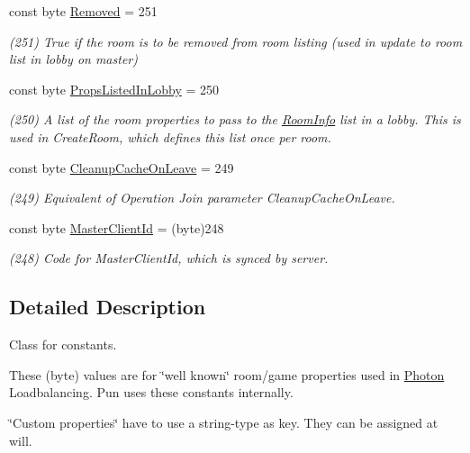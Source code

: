 \begin{DoxyCompactItemize}
const byte \hyperlink{class_exit_games_1_1_client_1_1_photon_1_1_game_property_key_a18ac3b26c2e0f3efbe3bd03afbae74f6}{Removed} = 251
\begin{DoxyCompactList}\small\item\em (251) True if the room is to be removed from room listing (used in update to room list in lobby on master)\end{DoxyCompactList}\item 
const byte \hyperlink{class_exit_games_1_1_client_1_1_photon_1_1_game_property_key_ae6a5330870a04b82f5acfe76ff067276}{Props\+Listed\+In\+Lobby} = 250
\begin{DoxyCompactList}\small\item\em (250) A list of the room properties to pass to the \hyperlink{class_room_info}{Room\+Info} list in a lobby. This is used in Create\+Room, which defines this list once per room.\end{DoxyCompactList}\item 
const byte \hyperlink{class_exit_games_1_1_client_1_1_photon_1_1_game_property_key_acc3065666f07d6e0fe5530add3955085}{Cleanup\+Cache\+On\+Leave} = 249
\begin{DoxyCompactList}\small\item\em (249) Equivalent of Operation Join parameter Cleanup\+Cache\+On\+Leave.\end{DoxyCompactList}\item 
const byte \hyperlink{class_exit_games_1_1_client_1_1_photon_1_1_game_property_key_ae06d85caaaad94ef81bb048f4e8a9c3c}{Master\+Client\+Id} = (byte)248
\begin{DoxyCompactList}\small\item\em (248) Code for Master\+Client\+Id, which is synced by server. \end{DoxyCompactList}\end{DoxyCompactItemize}


\subsection{Detailed Description}
Class for constants. 

These (byte) values are for \char`\"{}well known\char`\"{} room/game properties used in \hyperlink{namespace_exit_games_1_1_client_1_1_photon}{Photon} Loadbalancing. Pun uses these constants internally. 

\char`\"{}\+Custom properties\char`\"{} have to use a string-\/type as key. They can be assigned at will. 

